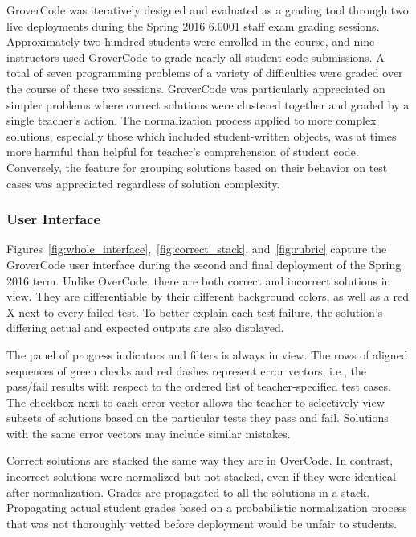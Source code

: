 GroverCode was iteratively designed and evaluated as a grading tool through two live deployments during the Spring 2016 6.0001 staff exam grading sessions. Approximately two hundred students were enrolled in the course, and nine instructors used GroverCode to grade nearly all student code submissions. A total of seven programming problems of a variety of difficulties were graded over the course of these two sessions. GroverCode was particularly appreciated on simpler problems where correct solutions were clustered together and graded by a single teacher's action. The normalization process applied to more complex solutions, especially those which included student-written objects, was at times more harmful than helpful for teacher's comprehension of student code. Conversely, the feature for grouping solutions based on their behavior on test cases was appreciated regardless of solution complexity.

\subsubsection{User Interface}

Figures~\ref{fig:whole_interface},~\ref{fig:correct_stack}, and~\ref{fig:rubric} capture the GroverCode user interface during the second and final deployment of the Spring 2016 term. Unlike OverCode, there are both correct and incorrect solutions in view. They are differentiable by their different background colors, as well as a red X next to every failed test. To better explain each test failure, the solution's differing actual and expected outputs are also displayed. 

The panel of progress indicators and filters is always in view. The rows of aligned sequences of green checks and red dashes represent error vectors, i.e., the pass/fail results with respect to the ordered list of teacher-specified test cases. The checkbox next to each error vector allows the teacher to selectively view subsets of solutions based on the particular tests they pass and fail. Solutions with the same error vectors may include similar mistakes.

Correct solutions are stacked the same way they are in OverCode. In contrast, incorrect solutions were normalized but not stacked, even if they were identical after normalization. Grades are propagated to all the solutions in a stack. Propagating actual student grades based on a probabilistic normalization process that was not thoroughly vetted before deployment would be unfair to students. 

